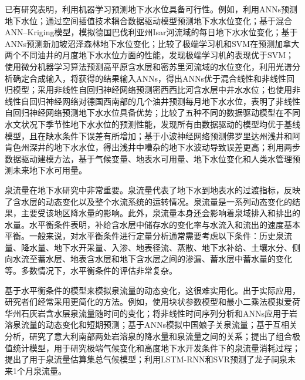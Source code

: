 已有研究表明，利用机器学习预测地下水水位具备可行性。例如，\citet{coppola2003artificial}利用ANNs预测地下水位；\citet{sun2013predicting}通过空间插值技术耦合数据驱动模型预测地下水水位变化；\citet{tapoglou2014spatio}基于混合ANN--Kriging模型，模拟德国巴伐利亚州Isar河流域的每日地下水水位变化；\citet{Sun2015Technical}基于ANNs预测新加坡沼泽森林地下水位变化；\citet{yadav2017assessing}比较了极端学习机和SVM在预测加拿大两个不同油井的月度地下水水位方面的性能，发现极端学习机的表现优于SVM；\citet{sahoo2017machine}使用微分机器学习算法预测高平原含水层和密苏里河流域的水位变化，利用光谱分析确定合成输入，将获得的结果输入ANNs，得出ANNs优于混合线性和非线性回归模型；\citet{guzman2017use}采用非线性自回归神经网络预测密西西比河含水层中井水水位；\citet{wunsch2018forecasting}也使用非线性自回归神经网络对德国西南部的几个油井预测每月地下水水位，表明了非线性自回归神经网络预测地下水水位具备优势；\citet{amaranto2018semi}比较了五种不同的数据驱动模型在不同水文状况下季节性地下水水位的预测性能，发现所有由数据驱动的模型均优于基线模型，且在缺水条件下误差有所增加；\citet{Rakhshandehroo2018Long}基于小波神经网络预测佛罗里达州浅井和阿肯色州深井的地下水水位，得出浅井中嘈杂的地下水波动导致误差更高；\citet{amaranto2019spatially}利用两步数据驱动建模方法，基于气候变量、地表水可用量、地下水位变化和人类水管理预测未来地下水可用量。

泉流量在地下水研究中非常重要\citep{toth1971groundwater,toth1999groundwater}。泉流量代表了地下水到地表水的过渡指标，反映了含水层的动态变化以及整个水流系统的运转情况。泉流量是一系列动态变化的结果，主要受该地区降水量的影响。此外，泉流量本身还会影响着泉域排入和排出的水量。水平衡条件表明，补给含水层中储存水的变化率与水流入和流出的速度基本平衡。一般来说，对水平衡条件进行定量分析通常需要考虑以下条件：历史泉流量、降水量、地下水开采量、入渗、地表径流、蒸散、地下水补给、土壤水分、侧向水流至蓄水层、地表含水层和地下含水层之间的渗漏、蓄水层中蓄水量的变化等。多数情况下，水平衡条件的评估非常复杂。

基于水平衡条件的模型来模拟泉流量的动态变化，这很难实用化。出于实际应用，研究者们经常采用更简化的方法。例如，\citet{zhang1996simulation}使用块状参数模型和最小二乘法模拟爱荷华州石灰岩含水层泉流量随时间的变化；\citet{lambrakis2000nonlinear}将非线性时间序列分析和ANNs应用于岩溶泉流量的动态变化和短期预测；\citet{hu2008simulation}基于ANNs模拟中国娘子关泉流量；\citet{fiorillo2010relation}基于互相关分析，研究了意大利南部两处岩溶泉的降水量和泉流量之间的关系；\citet{fan2013assembled}提出了组合极值统计模型，用于研究极端气候变化和高度地下水开发条件下的泉流量消耗过程；\citet{diodato2014predicting}提出了用于泉流量估算集总气候模型；\citet{cheng2021machine}利用LSTM-RNN和SVR预测了龙子祠泉未来1个月泉流量。


